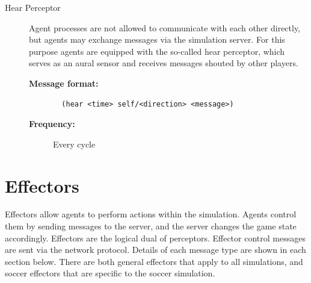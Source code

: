 \begin{description}
  \item [Hear Perceptor]
  Agent processes are not allowed to communicate with each other directly, but agents may exchange messages via the simulation server. For this purpose agents are equipped with the so-called hear perceptor, which serves as an aural sensor and receives messages shouted by other players. 
  \begin{description}
  \item[{\bf Message format:}]
  \begin{verbatim}
  (hear <time> self/<direction> <message>)
  \end{verbatim}
  \item[{\bf Frequency:}]
  Every cycle
  \end{description}

\end{description}
\section{Effectors}
Effectors allow agents to perform actions within the simulation. Agents control them by sending messages to the server, and the server changes the game state accordingly. Effectors are the logical dual of perceptors.
Effector control messages are sent via the network protocol. Details of each message type are shown in each section below.
There are both general effectors that apply to all simulations, and soccer effectors that are specific to the soccer simulation.\\
